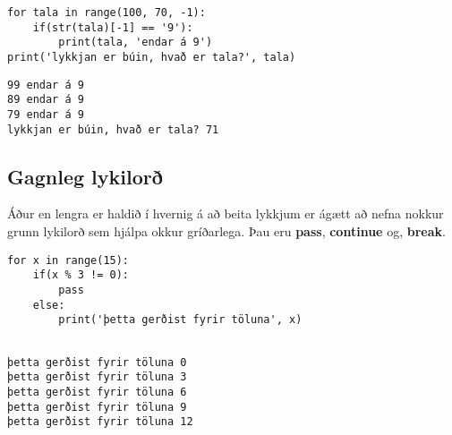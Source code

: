 \lstset{style=venjulegt}
\begin{lstlisting}[caption=for lykkja range() fallið notað til að telja aftur á bak, label=lst:lykkjur-range-mest]
for tala in range(100, 70, -1):
	if(str(tala)[-1] == '9'):
		print(tala, 'endar á 9')
print('lykkjan er búin, hvað er tala?', tala)
\end{lstlisting}

\lstset{style=uttak}
\begin{lstlisting}
99 endar á 9
89 endar á 9
79 endar á 9
lykkjan er búin, hvað er tala? 71
\end{lstlisting}
\lstset{style=venjulegt}

\subsection{Gagnleg lykilorð}\label{uk:lykkjulykilorð}
	Áður en lengra er haldið í hvernig á að beita lykkjum er ágætt að nefna nokkur grunn lykilorð sem hjálpa okkur gríðarlega.
	Þau eru \textbf{pass}, \textbf{continue} og, \textbf{break}.

\lstset{style=venjulegt}
\begin{lstlisting}[caption=Lykilorðið pass notað með for lykkju, label=lst:lykkjur-for-pass]
for x in range(15):
	if(x % 3 != 0):
		pass
	else:
		print('þetta gerðist fyrir töluna', x)
		
\end{lstlisting}
\lstset{style=uttak}
\begin{lstlisting}
þetta gerðist fyrir töluna 0
þetta gerðist fyrir töluna 3
þetta gerðist fyrir töluna 6
þetta gerðist fyrir töluna 9
þetta gerðist fyrir töluna 12
\end{lstlisting}

